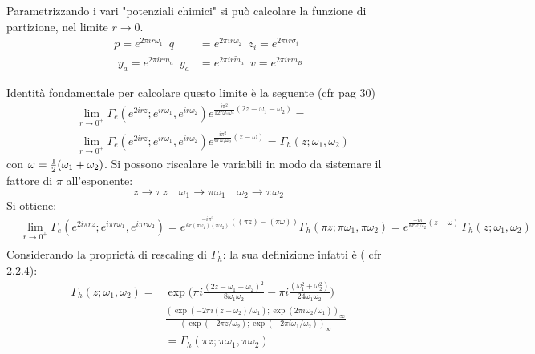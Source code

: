 \documentclass[a4paper,12pt]{article}
\begin{document}
Parametrizzando i vari "potenziali chimici" si può calcolare la funzione di partizione, nel limite $ r \rightarrow 0$.\\
$$
\begin{aligned}
p = e^{ 2 \pi i r  \omega_1 } \, \, \,  q &= e^{ 2 \pi i r \omega_2 } \,  \, \, z_i = e^{ 2 \pi i r \sigma_i } \\
\, \, y_a = e^{ 2 \pi i r m_a } \, \,  \,
y_a &= e^{ 2 \pi i r  {\tilde m_a} } \, \, \,  v = e^{ 2 \pi i r m_B}
\label{fugacities_redefined}
\end{aligned}
$$

Identità fondamentale per calcolare questo limite è la seguente (cfr \citep{vanDeBult:2007} pag 30)
\begin{align*}
&\lim_{r \rightarrow 0^+} \Gamma_e (e^{ 2 i r z}; e^{ i  r \omega_1} , e^{i r  \omega_2})
 e^{\frac{ i \pi^2 }{12  r \omega_1 \omega_2 } ( 2 z - \omega_1 -\omega_2)} =\\
&\lim_{r \rightarrow 0^+} \Gamma_e (e^{ 2 i r z}; e^{ i  r \omega_1} , e^{i r  \omega_2})
 e^{\frac{ i \pi^2 }{6 r \omega_1 \omega_2 } (  z - \omega )} = \Gamma_h(z;\omega_1 , \omega_2)
\end{align*}
con $ \omega = {1 \over 2 } ( \omega_1 + \omega_2)$.
Si possono riscalare le variabili in modo da sistemare il fattore di $\pi$ all'esponente:
$$
 z \rightarrow \pi z \quad  \omega_1 \rightarrow  \pi \omega_1 \quad  \omega_2 \rightarrow  \pi \omega_2
$$
Si ottiene:
\begin{align*}
&\lim_{r \rightarrow 0^+} \Gamma_e (e^{ 2 i \pi r z}; e^{ i \pi  r \omega_1} , e^{i \pi r  \omega_2}) =
 e^{\frac{ - i \pi^2 }{6 r  (\pi \omega_1) (\pi \omega_2) } ( (\pi z) - (\pi \omega))}\Gamma_h(\pi z; \pi \omega_1 ,\pi \omega_2) =   e^{\frac{ - i \pi }{6 r \omega_1 \omega_2 } (  z - \omega )} \, \Gamma_h ( z; \omega_1 , \omega_2 ) \\
\end{align*}
Considerando la proprietà di rescaling di $\Gamma_h$: la sua definizione infatti è ( cfr \citep{vanDeBult:2007} 2.2.4):
\begin{align*}
 \Gamma_h ( z;\omega_1, \omega_2) =& \exp \bigg( \pi i \frac{(2z-\omega_1 - \omega_2)^2}{8 \omega_1 \omega_2 } - \pi i \frac{(\omega_1^2 + \omega_2^2)}{ 24 \omega_1 \omega_2} \bigg) \\
 & \frac{ (\exp( -2 \pi i (z-\omega_2)/ \omega_1 ); \exp( 2 \pi i \omega_2 / \omega_1 ))_{\infty}}
 { (\exp( -2 \pi z / \omega_2 ); \exp( - 2 \pi i \omega_1 / \omega_2))_{\infty}}\\
 & = \Gamma_h ( \pi z; \pi \omega_1, \pi \omega_2)
\end{align*}
\end{document}
